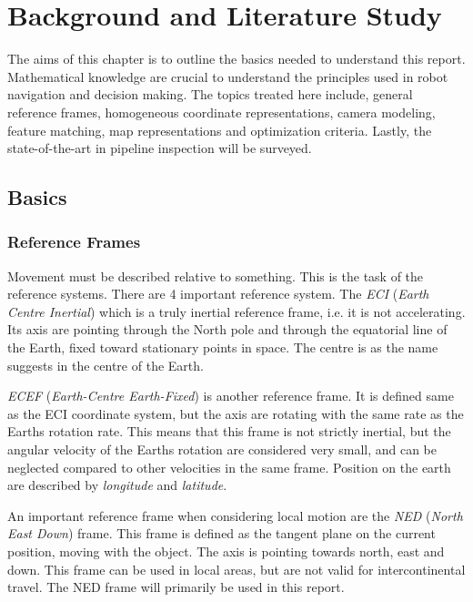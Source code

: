


\chapter{Background and Literature Study}
\label{chap2}
The aims of this chapter is to outline the basics needed to understand this report. Mathematical
knowledge are crucial to understand the principles used in robot navigation and decision
making. The topics treated here include, general reference frames, homogeneous coordinate
representations, camera modeling, feature matching, map representations and optimization
criteria. Lastly, the state-of-the-art in pipeline inspection will be surveyed. 



\section{Basics}

\subsection{Reference Frames}
	Movement must be described relative to something. This is the task of the reference systems. There are
	4 important reference system. The \emph{ECI} (\emph{Earth Centre Inertial}) which is a truly inertial reference
	frame, i.e. it is not accelerating. Its axis are pointing through the North pole and through the
	equatorial line of the Earth, fixed toward stationary points in space. The centre is as the name
	suggests in the centre of the Earth. 
	
	\emph{ECEF} (\emph{Earth-Centre Earth-Fixed}) is another reference frame. It is defined same as the ECI coordinate
	system, but the axis are rotating with the same rate as the Earths rotation rate. This means that this frame
	is not
	strictly inertial, but the angular velocity of the Earths rotation are considered very small, and can
	be neglected compared to other velocities in the same frame. Position on the earth are described by
	\emph{longitude} and \emph{latitude}.

	An important reference frame when considering local motion are the \emph{NED}
    (\emph{North East Down}) frame. This
	frame is defined as the tangent plane on the current position, moving with the object. The axis
	is pointing towards north, east and down. This frame can be used in local areas, but are
	not valid for intercontinental travel. The NED frame will primarily be used in this report. 

